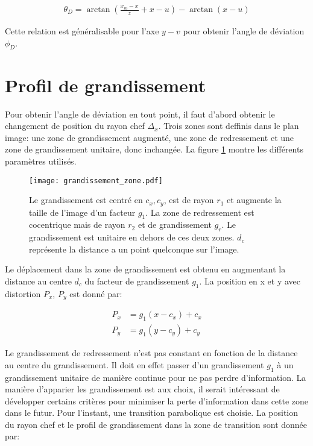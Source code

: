 \documentclass[a4paper,10pt]{article}
\numberwithin{equation}{section}
\numberwithin{figure}{section}
\numberwithin{table}{section}
\begin{document}
\begin{align}
	\theta_D = \arctan\left(\frac{x_m-x}{z} + x - u\right) - \arctan(x-u)
\end{align}

Cette relation est généralisable pour l'axe $y-v$ pour obtenir l'angle de déviation $\phi_D$.

\section{Profil de grandissement}

Pour obtenir l'angle de déviation en tout point, il faut d'abord obtenir le changement de position du rayon chef $\Delta_x$. Trois zones sont deffinis dans le plan image: une zone de grandissement augmenté, une zone de redressement et une zone de grandissement unitaire, donc inchangée. La figure \ref{fig:grandissement_zone} montre les différents paramètres utilisés.

\begin{figure}[ht]
	\centering
	\texttt{[image: grandissement\_zone.pdf]}
	\caption{Le grandissement est centré en $c_x , c_y$, est de rayon $r_1$ et augmente la taille de l'image d'un facteur $g_1$. La zone de redressement est cocentrique mais de rayon $r_2$ et de grandissement $g_r$. Le grandissement est unitaire en dehors de ces deux zones. $d_c$ représente la distance a un point quelconque sur l'image.}
	\label{fig:grandissement_zone}
\end{figure}

Le déplacement dans la zone de grandissement est obtenu en augmentant la distance au centre $d_c$ du facteur de grandissement $g_1$. La position en x et y avec distortion $P_x$, $P_y$ est donné par:

\begin{align}
	P_x &= g_1(x-c_x) + c_x \\
	P_y &= g_1(y-c_y) + c_y
\end{align}

Le grandissement de redressement n'est pas constant en fonction de la distance au centre du grandissement. Il doit en effet passer d'un grandissement $g_1$ à un grandissement unitaire de manière continue pour ne pas perdre d'information. La manière d'apparier les grandissement est aux choix, il serait intéressant de développer certains critères pour minimiser la perte d'information dans cette zone dans le futur. Pour l'instant, une transition parabolique est choisie. La position du rayon chef et le profil de grandissement dans la zone de transition sont donnée par:
\end{document}
